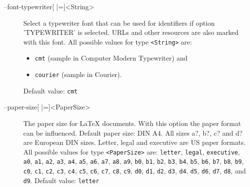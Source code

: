 \begin{description}
\item[--font-typewriter{[} |={]}<String>]
  Select a typewriter font that can be used for identifiers if
  option 'TYPEWRITER' is selected. URLs and other resources are
  also marked with this font.
  All possible values for type \texttt{<String>} are:
  \begin{itemize}
  \item \texttt{cmt} {\selectfont (sample in Computer Modern Typewriter)} and
  \item \texttt{courier} {\selectfont (sample in Courier)}.
  \end{itemize}
  Default value: \texttt{cmt}

\item[--paper-size{[} |={]}<PaperSize>]
  The paper size for \LaTeX{} documents. With this option the paper
  format can be influenced. Default paper size: DIN A4. All sizes
  a?, b?, c? and d? are European DIN sizes. Letter, legal and
  executive are US paper formats.
  All possible values for type \texttt{<PaperSize>} are:
  \texttt{letter}, \texttt{legal},
  \texttt{executive}, \texttt{a0},
  \texttt{a1}, \texttt{a2},
  \texttt{a3}, \texttt{a4},
  \texttt{a5}, \texttt{a6},
  \texttt{a7}, \texttt{a8},
  \texttt{a9}, \texttt{b0},
  \texttt{b1}, \texttt{b2},
  \texttt{b3}, \texttt{b4},
  \texttt{b5}, \texttt{b6},
  \texttt{b7}, \texttt{b8},
  \texttt{b9}, \texttt{c0},
  \texttt{c1}, \texttt{c2},
  \texttt{c3}, \texttt{c4},
  \texttt{c5}, \texttt{c6},
  \texttt{c7}, \texttt{c8},
  \texttt{c9}, \texttt{d0},
  \texttt{d1}, \texttt{d2},
  \texttt{d3}, \texttt{d4},
  \texttt{d5}, \texttt{d6},
  \texttt{d7}, \texttt{d8},
  and \texttt{d9}.
  Default value: \texttt{letter}
\end{description}

